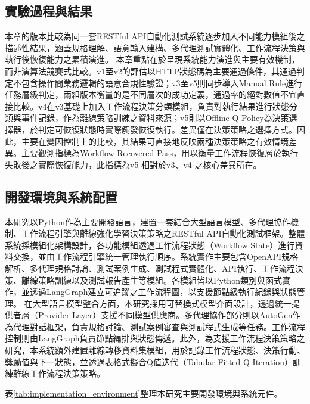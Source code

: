 \begin{ZhChapter}

\chapter{實驗過程與結果}
\text 本章的版本比較為同一套RESTful API自動化測試系統逐步加入不同能力模組後之描述性結果，涵蓋規格理解、語意輸入建構、多代理測試實體化、工作流程決策與執行後恢復能力之累積演進。
\text 本章重點在於呈現系統能力演進與主要有效機制，而非演算法競賽式比較。v1至v2的評估以HTTP狀態碼為主要通過條件，其通過判定不包含操作間業務邏輯的語意合規性驗證；v3至v5則同步導入Manual Rule進行任務層級判定，兩組版本衡量的是不同層次的成功定義，通過率的絕對數值不宜直接比較。v4在v3基礎上加入工作流程決策分類模組，負責對執行結果進行狀態分類與事件記錄，作為離線策略訓練之資料來源；v5則以Offline-Q Policy為決策選擇器，於判定可恢復狀態時實際觸發恢復執行。差異僅在決策策略之選擇方式。因此，主要在變因控制上的比較，其結果可直接地反映兩種決策策略之有效情境差異。主要觀測指標為Workflow Recovered Pass，用以衡量工作流程恢復層於執行失敗後之實際恢復能力，此指標為v5 相對於v3、v4 之核心差異所在。

\section{開發環境與系統配置}
\text 本研究以Python作為主要開發語言，建置一套結合大型語言模型、多代理協作機制、工作流程引擎與離線強化學習決策策略之RESTful API自動化測試框架。整體系統採模組化架構設計，各功能模組透過工作流程狀態（Workflow State）進行資料交換，並由工作流程引擎統一管理執行順序。系統實作主要包含OpenAPI規格解析、多代理規格討論、測試案例生成、測試程式實體化、API執行、工作流程決策、離線策略訓練以及測試報告產生等模組。各模組皆以Python類別與函式實作，並透過LangGraph建立可追蹤之工作流程圖，以支援節點級執行紀錄與狀態管理。
\text 在大型語言模型整合方面，本研究採用可替換式模型介面設計，透過統一提供者層（Provider Layer）支援不同模型供應商。多代理協作部分則以AutoGen作為代理對話框架，負責規格討論、測試案例審查與測試程式生成等任務。工作流程控制則由LangGraph負責節點編排與狀態傳遞。此外，為支援工作流程決策策略之研究，本系統額外建置離線轉移資料集模組，用於記錄工作流程狀態、決策行動、獎勵值與下一狀態，並透過表格式擬合Q值迭代（Tabular Fitted Q Iteration）訓練離線工作流程決策策略。

表\ref{tab:implementation_environment}整理本研究主要開發環境與系統元件。


\end{ZhChapter}
